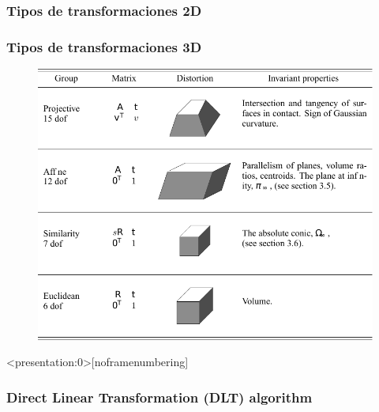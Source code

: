\begin{frame}
    \frametitle{Tipos de transformaciones 2D}

    
\end{frame}


\begin{frame}
    \frametitle{Tipos de transformaciones 3D}
    \footnotesize
    
    \begin{figure}
        \includegraphics[width=0.6\columnwidth]{./images/transformation_table_3d.pdf}
    \end{figure}
    
\end{frame}


\begin{frame}<presentation:0>[noframenumbering]
    \frametitle{Direct Linear Transformation (DLT) algorithm}
    \footnotesize
    
\end{frame}
